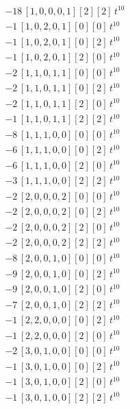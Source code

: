 \begin{align*}
-18\,[1,0,0,0,1] [2] [2]\,t^{10} \\
-1\,[1,0,2,0,1] [0] [0]\,t^{10} \\
-1\,[1,0,2,0,1] [0] [2]\,t^{10} \\
-1\,[1,0,2,0,1] [2] [0]\,t^{10} \\
-2\,[1,1,0,1,1] [0] [0]\,t^{10} \\
-2\,[1,1,0,1,1] [0] [2]\,t^{10} \\
-2\,[1,1,0,1,1] [2] [0]\,t^{10} \\
-1\,[1,1,0,1,1] [2] [2]\,t^{10} \\
-8\,[1,1,1,0,0] [0] [0]\,t^{10} \\
-6\,[1,1,1,0,0] [0] [2]\,t^{10} \\
-6\,[1,1,1,0,0] [2] [0]\,t^{10} \\
-3\,[1,1,1,0,0] [2] [2]\,t^{10} \\
-2\,[2,0,0,0,2] [0] [0]\,t^{10} \\
-2\,[2,0,0,0,2] [0] [2]\,t^{10} \\
-2\,[2,0,0,0,2] [2] [0]\,t^{10} \\
-2\,[2,0,0,0,2] [2] [2]\,t^{10} \\
-8\,[2,0,0,1,0] [0] [0]\,t^{10} \\
-9\,[2,0,0,1,0] [0] [2]\,t^{10} \\
-9\,[2,0,0,1,0] [2] [0]\,t^{10} \\
-7\,[2,0,0,1,0] [2] [2]\,t^{10} \\
-1\,[2,2,0,0,0] [0] [2]\,t^{10} \\
-1\,[2,2,0,0,0] [2] [0]\,t^{10} \\
-2\,[3,0,1,0,0] [0] [0]\,t^{10} \\
-1\,[3,0,1,0,0] [0] [2]\,t^{10} \\
-1\,[3,0,1,0,0] [2] [0]\,t^{10} \\
-1\,[3,0,1,0,0] [2] [2]\,t^{10}
\end{align*}
